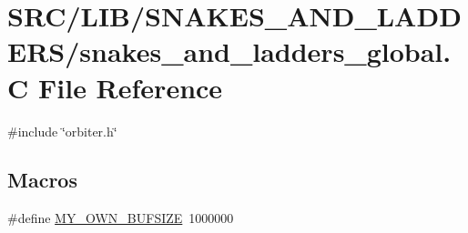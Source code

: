 \hypertarget{snakes__and__ladders__global_8_c}{}\section{S\+R\+C/\+L\+I\+B/\+S\+N\+A\+K\+E\+S\+\_\+\+A\+N\+D\+\_\+\+L\+A\+D\+D\+E\+R\+S/snakes\+\_\+and\+\_\+ladders\+\_\+global.C File Reference}
\label{snakes__and__ladders__global_8_c}
{\ttfamily \#include \char`\"{}orbiter.\+h\char`\"{}}\newline
\subsection*{Macros}
\begin{DoxyCompactItemize}
\item 
\#define \mbox{\hyperlink{snakes__and__ladders__global_8_c_a0463169ae06f05be3901c8692117ec7e}{M\+Y\+\_\+\+O\+W\+N\+\_\+\+B\+U\+F\+S\+I\+ZE}}~1000000
\end{DoxyCompactItemize}
